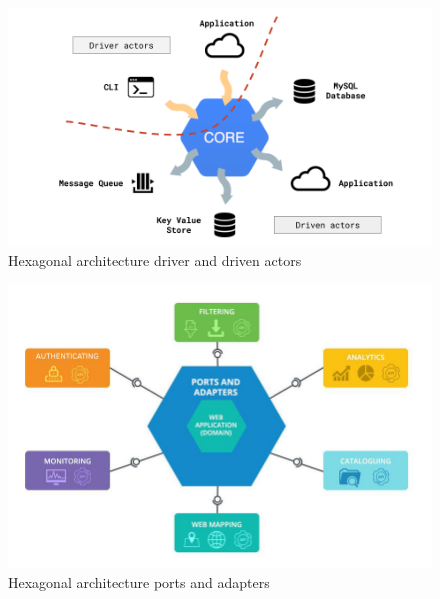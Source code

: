 \begin{figure}[h]
    \centering
    \includegraphics[scale=0.3]{images/hexa-actor.png}
    \caption{Hexagonal architecture driver and driven actors \cite{varela_2020}}
    \label{fig:hexagonal-actor}
\end{figure}


\begin{figure}[h]
    \centering
    \includegraphics[scale=0.3]{images/Hexagonal-Architecture-Ports-and-Adapters-Design-Pattern}
    \caption{Hexagonal architecture ports and adapters~\cite{ports-and-adapters-figure}}
    \label{fig:ports-adapters}
\end{figure}




